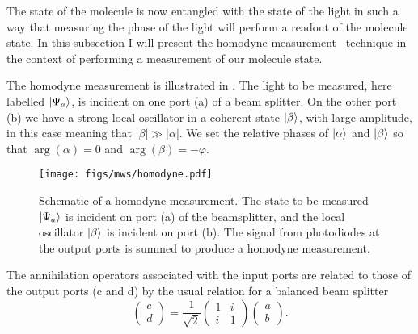 The state of the molecule is now entangled with the state of the light in such
a way that measuring the phase of the light will perform a readout of the
molecule state. In this subsection I will present the homodyne
measurement~\cite{agarwal2012} technique in the context of performing a
measurement of our molecule state.

The homodyne measurement is illustrated in . The
light to be measured, here labelled $\ket{\Psi_a}$, is incident on one port (a)
of a beam splitter. On the other port (b) we have a strong local oscillator in
a coherent state $\ket{\beta}$, with large amplitude, in this case meaning that
$|\beta| \gg |\alpha|$. We set the relative phases of $\ket{\alpha}$ and
$\ket{\beta}$ so that $\arg(\alpha)=0$ and $\arg(\beta)=-\varphi$.

\begin{figure}
  \centering
  \texttt{[image: figs/mws/homodyne.pdf]}
  \caption{Schematic of a homodyne measurement. The state to be measured
    $\ket{\Psi_a}$ is incident on port (a) of the beamsplitter, and the local
    oscillator $\ket{\beta}$ is incident on port (b). The signal from
    photodiodes at the output ports is summed to produce a homodyne
    measurement.
  }
  \label{mws:fig:homodyne}
\end{figure}

The annihilation operators associated with the input ports are related to those
of the output ports (c and d) by the usual relation for a balanced beam
splitter~\cite{agarwal2012}
%
\begin{equation}
  \label{squeeze:eqn:bsmat}
  \begin{pmatrix} c \\ d \end{pmatrix} = \frac{1}{\sqrt{2}}\begin{pmatrix}
    1 & i \\ i & 1 
  \end{pmatrix}  \begin{pmatrix} a \\ b \end{pmatrix}.
\end{equation}

